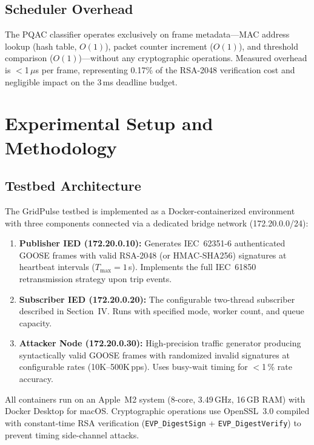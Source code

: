 \documentclass[journal]{IEEEtran}
\begin{document}
\subsection{Scheduler Overhead}
The PQAC classifier operates exclusively on frame metadata---MAC address lookup (hash table, $O(1)$), packet counter increment ($O(1)$), and threshold comparison ($O(1)$)---without any cryptographic operations. Measured overhead is $<$1\,$\mu$s per frame, representing 0.17\% of the RSA-2048 verification cost and negligible impact on the 3\,ms deadline budget.

\section{Experimental Setup and Methodology}

\subsection{Testbed Architecture}
The GridPulse testbed is implemented as a Docker-containerized environment with three components connected via a dedicated bridge network (172.20.0.0/24):
\begin{enumerate}[leftmargin=*]
    \item \textbf{Publisher IED (172.20.0.10):} Generates IEC~62351-6 authenticated GOOSE frames with valid RSA-2048 (or HMAC-SHA256) signatures at heartbeat intervals ($T_{\max} = 1$\,s). Implements the full IEC~61850 retransmission strategy upon trip events.
    \item \textbf{Subscriber IED (172.20.0.20):} The configurable two-thread subscriber described in Section~IV. Runs with specified mode, worker count, and queue capacity.
    \item \textbf{Attacker Node (172.20.0.30):} High-precision traffic generator producing syntactically valid GOOSE frames with randomized invalid signatures at configurable rates (10K--500K\,pps). Uses busy-wait timing for $<$1\,\% rate accuracy.
\end{enumerate}

All containers run on an Apple~M2 system (8-core, 3.49\,GHz, 16\,GB RAM) with Docker Desktop for macOS. Cryptographic operations use OpenSSL~3.0 compiled with constant-time RSA verification (\texttt{EVP\_DigestSign} + \texttt{EVP\_DigestVerify}) to prevent timing side-channel attacks.
\end{document}
